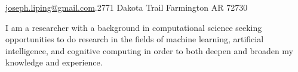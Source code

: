 \documentclass[11pt,a4paper]{article}
\begin{document}
\sloppy  %



\nobreakvspace{0.3em}  %

\noindent\href{mailto:joseph.liping@gmail.com}{joseph.liping\mbox{}@\mbox{}gmail.com}.2771 Dakota Trail Farmington AR 72730

\spacedhrule{0.9em}{-0.4em}  %


	I am a researcher with a background in computational science seeking opportunities to do research in the fields of machine learning, artificial intelligence, and cognitive computing in order to both deepen and broaden my knowledge and experience.

\vspace{0.5em}  %


\spacedhrule{0em}{-0.4em}


\end{document}

